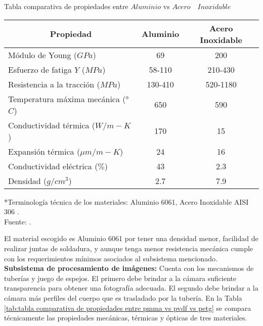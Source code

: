 \begin{mytable}[H]
	\footnotesize\centering
	\caption{Tabla comparativa de propiedades entre $Aluminio$ vs $Acero \quad Inoxidable$}
	\label{tab:tabla comparativa de propiedades entre aluminio vs acero inoxidable}
	\begin{tabular}{|l|c|c|}
		\hline
		\multicolumn{1}{|c|}{\textbf{Propiedad}} & \textbf{Aluminio} & \textbf{Acero Inoxidable} \\ \hline
		Módulo de Young ($GPa$) & 69 & 200 \\ \hline
		Esfuerzo de fatiga $Y$ ($MPa$) & 58-110 & 210-430 \\ \hline
		Resistencia a la tracción ($MPa$) & 130-410 & 520-1180 \\ \hline
		Temperatura máxima mecánica (°$C$) & 650 & 590 \\ \hline
		Conductividad térmica ($W/m-K$) & 170 & 15 \\ \hline
		Expansión térmica (${\mu}m/m-K$) & 24 & 16 \\ \hline
		Conductividad eléctrica ($\%$) & 43 & 2.3 \\ \hline
		Densidad ($g/cm^3$) & 2.7 & 7.9 \\ \hline
	\end{tabular}
	\begin{myflushcenteraftertable}
		*Terminología técnica de los materiales: Aluminio 6061, Acero Inoxidable AISI 306 .\\		
		Fuente: \cite{MakeItFrom2020}.
	\end{myflushcenteraftertable}
\end{mytable}

El material escogido es Aluminio 6061 por tener una densidad menor, facilidad de realizar juntas de soldadura, y aunque tenga menor resistencia mecánica cumple con los requerimientos mínimos asociados al subsistema mencionado.\\

\textbf{Subsistema de procesamiento de imágenes:} Cuenta con los mecanismos de tuberías y juego de espejos. El primero debe brindar a la cámara suficiente transparencia para obtener una fotografía adecuada. El segundo debe brindar a la cámara más perfiles del cuerpo que es trasladado por la tubería. En la Tabla \ref{tab:tabla comparativa de propiedades entre pmma vs pvdf vs petg} se compara técnicamente las propiedades mecánicas, térmicas y ópticas de tres materiales.

